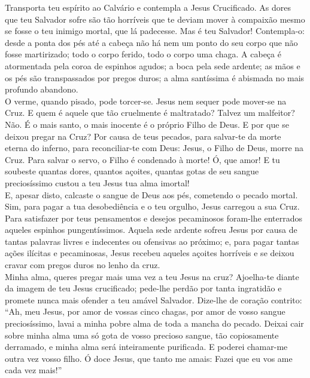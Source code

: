 \documentclass{book}
\begin{document}
\begin{flushleft}
    Transporta teu espírito ao Calvário e contempla a Jesus Crucificado. As dores que teu Salvador sofre são tão horríveis que te deviam mover à compaixão mesmo se fosse o teu inimigo mortal, que lá padecesse. Mas é teu Salvador! Contempla-o: desde a ponta dos pés até a cabeça não há nem um ponto do seu corpo que não fosse martirizado; todo o corpo ferido, todo o corpo uma chaga. A cabeça é atormentada pela coroa de espinhos agudos; a boca pela sede ardente; as mãos e os pés são transpassados por pregos duros; a alma santíssima é abismada no mais profundo abandono.
    \vspace{.2cm} \\
    O verme, quando pisado, pode torcer-se. Jesus nem sequer pode mover-se na Cruz. E quem é aquele que tão cruelmente é maltratado? Talvez um malfeitor? Não. É o mais santo, o mais inocente é o próprio Filho de Deus. E por que se deixou pregar na Cruz? Por causa de teus pecados, para salvar-te da morte eterna do inferno, para reconciliar-te com Deus: Jesus, o Filho de Deus, morre na Cruz. Para salvar o servo, o Filho é condenado à morte! Ó, que amor! E tu soubeste quantas dores, quantos açoites, quantas gotas de seu sangue preciosíssimo custou a teu Jesus tua alma imortal!
    \vspace{.2cm} \\
    E, apesar disto, calcaste o sangue de Deus aos pés, cometendo o pecado mortal. Sim, para pagar a tua desobediência e o teu orgulho, Jesus carregou a sua Cruz. Para satisfazer por teus pensamentos e desejos pecaminosos foram-lhe enterrados aqueles espinhos pungentíssimos. Aquela sede ardente sofreu Jesus por causa de tantas palavras livres e indecentes ou ofensivas ao próximo; e, para pagar tantas ações ilícitas e pecaminosas, Jesus recebeu aqueles açoites horríveis e se deixou cravar com pregos duros no lenho da cruz.
    \vspace{.2cm} \\
    Minha alma, queres pregar mais uma vez a teu Jesus na cruz? Ajoelha-te diante da imagem de teu Jesus crucificado; pede-lhe perdão por tanta ingratidão e promete nunca mais ofender a teu amável Salvador. Dize-lhe de coração contrito: ``Ah, meu Jesus, por amor de vossas cinco chagas, por amor de vosso sangue preciosíssimo, lavai a minha pobre alma de toda a mancha do pecado. Deixai cair sobre minha alma uma só gota de vosso precioso sangue, tão copiosamente derramado, e minha alma será inteiramente purificada. E poderei chamar-me outra vez vosso filho. Ó doce Jesus, que tanto me amais: Fazei que eu vos ame cada vez mais!''
\end{flushleft}
\end{document}
